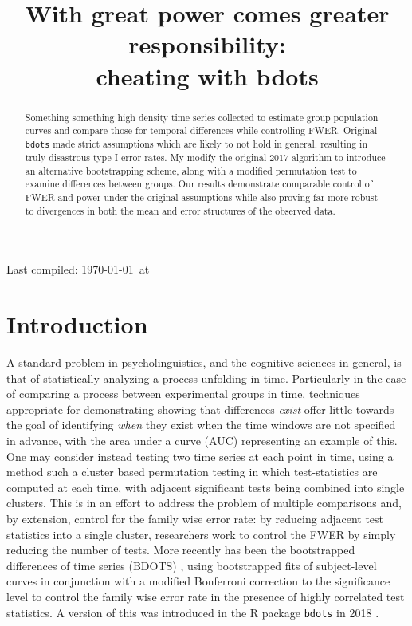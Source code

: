\documentclass{article}
\title{With great power comes greater responsibility: \\
\large cheating with bdots}
\date{}
\newcommand{\xt}{\texttt}
\begin{document}

\maketitle

Last compiled: \today \  at \currenttime

%

\begin{abstract}
Something something high density time series collected to estimate group population curves and compare those for temporal differences while controlling FWER. Original \xt{bdots} made strict assumptions which are likely to not hold in general, resulting in truly disastrous type I error rates. My modify the original 2017 algorithm to introduce an alternative bootstrapping scheme, along with a modified permutation test to examine differences between groups. Our results demonstrate comparable control of FWER and power under the original assumptions while also proving far more robust to divergences in both the mean and error structures of the observed data.
\end{abstract}

\section{Introduction}

A standard problem in psycholinguistics, and the cognitive sciences in general, is that of statistically analyzing a process unfolding in time. Particularly in the case of comparing a process between experimental groups in time, techniques appropriate for demonstrating showing that differences \textit{exist} offer little towards the goal of identifying \textit{when} they exist when the time windows are not specified in advance, with the area under a curve (AUC) representing an example of this. One may consider instead testing two time series at each point in time, using a method such a cluster based permutation testing \cite{Maris2007} in which test-statistics are computed at each time, with adjacent significant tests being combined into single clusters. This is in an effort to address the problem of multiple comparisons and, by extension, control for the family wise error rate: by reducing adjacent test statistics into a single cluster, researchers work to control the FWER by simply reducing the number of tests. More recently has been the bootstrapped differences of time series (BDOTS) \cite{oleson2017detecting}, using bootstrapped fits of subject-level curves in conjunction with a modified Bonferroni correction to the significance level to control the family wise error rate in the presence of highly correlated test statistics. A version of this was introduced in the R package \xt{bdots} in 2018 \cite{seedorff2018bdots}.
\end{document}
